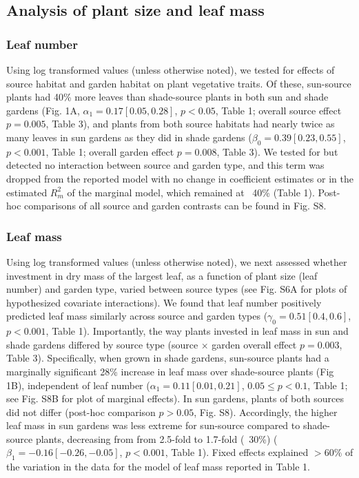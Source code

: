 \documentclass[11pt, oneside]{amsart}
\begin{document}
\clearpage

\subsection{Analysis of plant size and leaf mass}

\subsubsection{Leaf number} Using log transformed values (unless otherwise noted), we tested for effects of source habitat and garden habitat on plant vegetative traits. Of these, sun-source plants had 40\% more leaves than shade-source plants in both sun and shade gardens (Fig. 1A, $\alpha_{1}= 0.17 [0.05, 0.28]$, $p < 0.05$, Table 1; overall source effect $p=0.005$, Table 3), and plants from both source habitats had nearly twice as many leaves in sun gardens as they did in shade gardens ($\beta_{0} = 0.39 [0.23, 0.55]$, $p<0.001$, Table 1; overall garden effect $p=0.008$, Table 3). We tested for but detected no interaction between source and garden type, and this term was dropped from the reported model with no change in coefficient estimates or in the estimated $R^{2}_{m}$ of the marginal model, which remained at ~40\% (Table 1). Post-hoc comparisons of all source and garden contrasts can be found in Fig. S8.

\subsubsection{Leaf mass} Using log transformed values (unless otherwise noted), we next assessed whether investment in dry mass of the largest leaf, as a function of plant size (leaf number) and garden type, varied between source types (see Fig. S6A for plots of hypothesized covariate interactions). We found that leaf number positively predicted leaf mass similarly across source and garden types ($\gamma_{0} = 0.51 [0.4, 0.6]$, $p<0.001$, Table 1). Importantly, the way plants invested in leaf mass in sun and shade gardens differed by source type (source $\times$ garden overall effect $p=0.003$, Table 3). Specifically, when grown in shade gardens, sun-source plants had a marginally significant 28\% increase in leaf mass over shade-source plants (Fig 1B), independent of leaf number ($\alpha_{1} = 0.11 [0.01, 0.21]$, $0.05\leq p<0.1$, Table 1; see Fig. S8B for plot of marginal effects). In sun gardens, plants of both sources did not differ (post-hoc comparison $p>0.05$, Fig. S8). Accordingly, the higher leaf mass in sun gardens was less extreme for sun-source compared to shade-source plants, decreasing from from 2.5-fold to 1.7-fold (~30\%) ($\beta_{1}= -0.16 [-0.26, -0.05]$, $p<0.001$, Table 1). Fixed effects explained $>60\%$ of the variation in the data for the model of leaf mass reported in Table 1.
\end{document}
